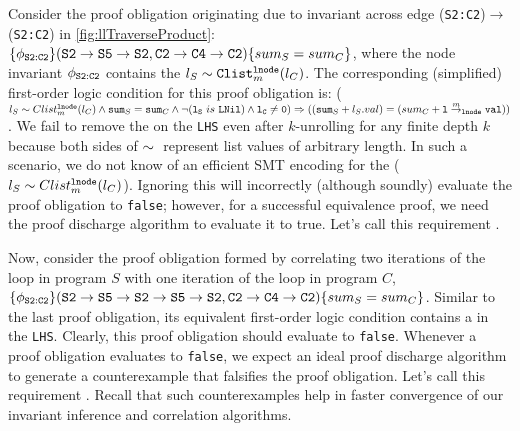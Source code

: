 Consider the proof obligation originating due to  invariant across edge ({\tt S2:C2})$\rightarrow$({\tt S2:C2}) in \cref{fig:llTraverseProduct}:
$\{\phi_{{\tt S2:C2}}\} ({\tt S2\rightarrow S5\rightarrow S2}, {\tt C2\rightarrow C4\rightarrow C2}) \{sum_{S} = sum_{C}\}$, where
the node invariant $\phi_{{\tt S2:C2}}$ contains
the \recursiveRelation{} $l_{S}\sim{}{\tt Clist}^{{\tt lnode}}_{m}(l_{C})$.
The corresponding (simplified) first-order logic condition for this
proof obligation is:
($l_{S}\sim{}Clist^{{\tt lnode}}_{m}(l_{C}) \land {\tt sum}_S={\tt sum}_C \land \neg({\tt l_S}\ is\ {\tt LNil}) \land {\tt l_C\neq0}) \Rightarrow (({\tt sum}_S + l_S.val) = (sum_C + {\tt l} \overset{m}{\rightarrow}_{{\tt lnode}} {\tt val}))$.
We fail to remove the \recursiveRelation{} on the {\tt LHS} even after
$k$-unrolling for any finite depth $k$ because both sides of $\sim{}$
represent list values of arbitrary length.
In such a scenario, we do not know of an efficient
SMT encoding for the \recursiveRelation{} ($l_{S}\sim{}Clist^{{\tt lnode}}_{m}(l_{C})$).
Ignoring this \recursiveRelation{} will incorrectly (although soundly) evaluate
the proof obligation to {\tt false}; however, for a successful equivalence
proof, we need
the proof discharge algorithm to evaluate it to true. Let's call this
requirement .

Now, consider the proof obligation formed by correlating two iterations
of the loop in program $S$ with one iteration of the loop in program $C$,
$\{\phi_{{\tt S2:C2}}\} ({\tt S2\rightarrow S5\rightarrow S2\rightarrow S5\rightarrow S2}, {\tt C2\rightarrow C4\rightarrow C2}) \{sum_{S} = sum_{C}\}$.
Similar to the last proof obligation, its equivalent first-order logic condition contains a \recursiveRelation{} in the {\tt LHS}.
Clearly, this proof obligation should evaluate to {\tt false}.
Whenever a proof
obligation evaluates to {\tt false}, we
expect an ideal proof discharge algorithm to generate a
counterexample that falsifies the proof obligation.
Let's call this
requirement .
Recall that such counterexamples help in faster
convergence of our invariant inference and correlation algorithms.

